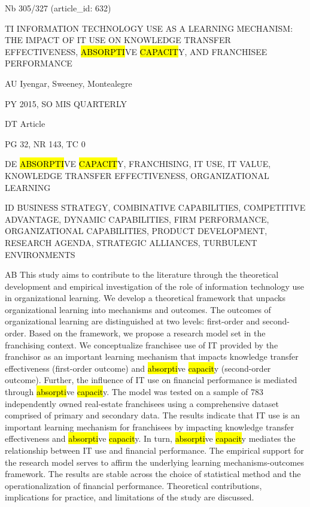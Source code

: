 \documentclass[a4paper]{article}
\begin{document}
\vspace*{-2cm}
Nb \tabto{0cm}305/327 (article\_id: 632)\par
TI \tabto{0cm}INFORMATION TECHNOLOGY USE AS A LEARNING MECHANISM: THE IMPACT OF IT USE ON KNOWLEDGE TRANSFER EFFECTIVENESS, \hl{ABSORPTI}VE \hl{CAPACIT}Y, AND FRANCHISEE PERFORMANCE\par
AU \tabto{0cm}Iyengar, Sweeney, Montealegre\par
PY \tabto{0cm}2015, SO MIS QUARTERLY\par
DT \tabto{0cm}Article\par
PG \tabto{0cm}32, NR 143, TC 0\par
DE \tabto{0cm}\hl{ABSORPTI}VE \hl{CAPACIT}Y, FRANCHISING, IT USE, IT VALUE, KNOWLEDGE TRANSFER EFFECTIVENESS, ORGANIZATIONAL LEARNING\par
ID \tabto{0cm}BUSINESS STRATEGY, COMBINATIVE CAPABILITIES, COMPETITIVE ADVANTAGE, DYNAMIC CAPABILITIES, FIRM PERFORMANCE, ORGANIZATIONAL CAPABILITIES, PRODUCT DEVELOPMENT, RESEARCH AGENDA, STRATEGIC ALLIANCES, TURBULENT ENVIRONMENTS\par
AB \tabto{0cm}This study aims to contribute to the literature through the theoretical development and empirical investigation of the role of information technology use in organizational learning. We develop a theoretical framework that unpacks organizational learning into mechanisms and outcomes. The outcomes of organizational learning are distinguished at two levels: first-order and second-order. Based on the framework, we propose a research model set in the franchising context. We conceptualize franchisee use of IT provided by the franchisor as an important learning mechanism that impacts knowledge transfer effectiveness (first-order outcome) and \hl{absorpti}ve \hl{capacit}y (second-order outcome). Further, the influence of IT use on financial performance is mediated through \hl{absorpti}ve \hl{capacit}y. The model was tested on a sample of 783 independently owned real-estate franchisees using a comprehensive dataset comprised of primary and secondary data. The results indicate that IT use is an important learning mechanism for franchisees by impacting knowledge transfer effectiveness and \hl{absorpti}ve \hl{capacit}y. In turn, \hl{absorpti}ve \hl{capacit}y mediates the relationship between IT use and financial performance. The empirical support for the research model serves to affirm the underlying learning mechanisms-outcomes framework. The results are stable across the choice of statistical method and the operationalization of financial performance. Theoretical contributions, implications for practice, and limitations of the study are discussed.\par
\clearpage
\end{document}
